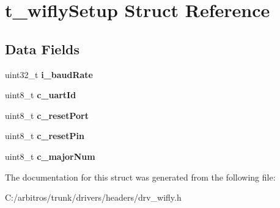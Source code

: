 \hypertarget{structt__wifly_setup}{\section{t\-\_\-wifly\-Setup Struct Reference}
\label{structt__wifly_setup}
}
\subsection*{Data Fields}
\begin{DoxyCompactItemize}
\item 
\hypertarget{structt__wifly_setup_ac316d01a82a05edc681fdfe0bac24060}{uint32\-\_\-t {\bfseries i\-\_\-baud\-Rate}}\label{structt__wifly_setup_ac316d01a82a05edc681fdfe0bac24060}

\item 
\hypertarget{structt__wifly_setup_a40f57779b05162e1cea2635c18c6dad9}{uint8\-\_\-t {\bfseries c\-\_\-uart\-Id}}\label{structt__wifly_setup_a40f57779b05162e1cea2635c18c6dad9}

\item 
\hypertarget{structt__wifly_setup_acb0d8d132b658f993e6ac65fb0d0ae5e}{uint8\-\_\-t {\bfseries c\-\_\-reset\-Port}}\label{structt__wifly_setup_acb0d8d132b658f993e6ac65fb0d0ae5e}

\item 
\hypertarget{structt__wifly_setup_a1ee0c0699d1dbe284528184449423455}{uint8\-\_\-t {\bfseries c\-\_\-reset\-Pin}}\label{structt__wifly_setup_a1ee0c0699d1dbe284528184449423455}

\item 
\hypertarget{structt__wifly_setup_afba9106eb2fa769623759a1b529f884e}{uint8\-\_\-t {\bfseries c\-\_\-major\-Num}}\label{structt__wifly_setup_afba9106eb2fa769623759a1b529f884e}

\end{DoxyCompactItemize}


The documentation for this struct was generated from the following file\-:\begin{DoxyCompactItemize}
\item 
C\-:/arbitros/trunk/drivers/headers/drv\-\_\-wifly.\-h\end{DoxyCompactItemize}
